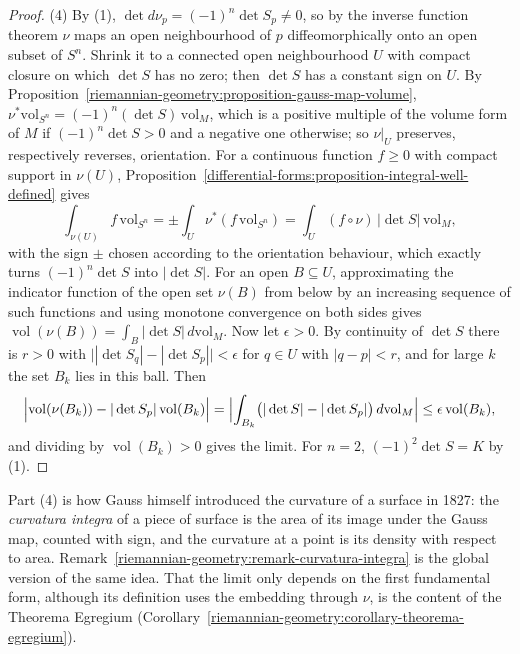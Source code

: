 \begin{proof}
(4) By (1), $\det d\nu_p = (-1)^n\det S_p \neq 0$, so by the inverse function theorem $\nu$ maps an open neighbourhood of $p$ diffeomorphically onto an open subset of $S^n$. Shrink it to a connected open
neighbourhood $U$ with compact closure on which $\det S$ has no zero; then $\det S$ has a constant sign on $U$. By Proposition~\ref{riemannian-geometry:proposition-gauss-map-volume},
$\nu^*\mathrm{vol}_{S^n} = (-1)^n(\det S)\,\mathrm{vol}_M$, which is a positive multiple of the volume form of $M$ if $(-1)^n\det S > 0$ and a negative one otherwise; so $\nu|_U$ preserves, respectively reverses,
orientation. For a continuous function $f \geq 0$ with compact support in $\nu(U)$, Proposition~\ref{differential-forms:proposition-integral-well-defined} gives
\[
\int_{\nu(U)}f\,\mathrm{vol}_{S^n} = \pm\int_U\nu^*(f\,\mathrm{vol}_{S^n}) = \int_U(f \circ \nu)\,|\det S|\,\mathrm{vol}_M ,
\]
with the sign $\pm$ chosen according to the orientation behaviour, which exactly turns $(-1)^n\det S$ into $|\det S|$. For an open $B \subseteq U$, approximating the indicator function of the open set $\nu(B)$
from below by an increasing sequence of such functions and using monotone convergence on both sides gives $\operatorname{vol}(\nu(B)) = \int_B|\det S|\,d\mathrm{vol}_M$. Now let $\epsilon > 0$. By
continuity of $\det S$ there is $r > 0$ with $\bigl||\det S_q| - |\det S_p|\bigr| < \epsilon$ for $q \in U$ with $|q - p| < r$, and for large $k$ the set $B_k$ lies in this ball. Then
\[
\Bigl|\operatorname{vol}(\nu(B_k)) - |\det S_p|\operatorname{vol}(B_k)\Bigr| = \Bigl|\int_{B_k}\bigl(|\det S| - |\det S_p|\bigr)\,d\mathrm{vol}_M\Bigr| \leq \epsilon\operatorname{vol}(B_k) ,
\]
and dividing by $\operatorname{vol}(B_k) > 0$ gives the limit. For $n = 2$, $(-1)^2\det S = K$ by (1).
\end{proof}

Part (4) is how Gauss himself introduced the curvature of a surface in 1827: the \emph{curvatura integra} of a piece of surface is the area of its image under the Gauss map, counted with sign, and the
curvature at a point is its density with respect to area. Remark~\ref{riemannian-geometry:remark-curvatura-integra} is the global version of the same idea. That the limit only depends on the first
fundamental form, although its definition uses the embedding through $\nu$, is the content of the Theorema Egregium (Corollary~\ref{riemannian-geometry:corollary-theorema-egregium}).

